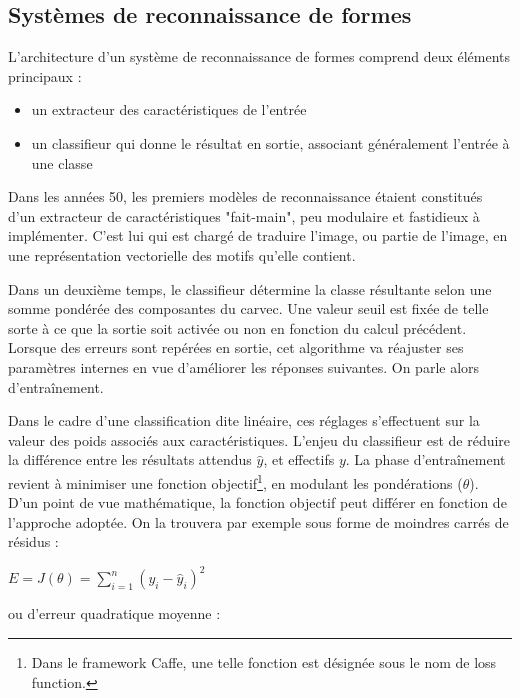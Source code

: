 \documentclass[12pt]{report}
\begin{document}
\subsection{Systèmes de reconnaissance de formes}

L'architecture d'un système de reconnaissance de formes comprend deux éléments principaux :

\begin{itemize}
  \item un extracteur des caractéristiques de l'entrée
  \item un classifieur qui donne le résultat en sortie, associant généralement l'entrée à une classe
\end{itemize}



Dans les années 50, les premiers modèles de reconnaissance étaient constitués d'un extracteur de caractéristiques "fait-main", peu modulaire et fastidieux à implémenter\cite{Bib_LeCun}.
C'est lui qui est chargé de traduire l'image, ou partie de l'image, en une représentation vectorielle des motifs qu'elle contient.
\par
Dans un deuxième temps, le classifieur détermine la classe résultante selon une somme pondérée des composantes du \gls{carvec}.
Une valeur seuil est fixée de telle sorte à ce que la sortie soit activée ou non en fonction du calcul précédent.
Lorsque des erreurs sont repérées en sortie, cet algorithme va réajuster ses paramètres internes en vue d'améliorer les réponses suivantes. On parle alors d'entraînement.
\par
Dans le cadre d'une classification dite linéaire, ces réglages s'effectuent sur la valeur des poids associés aux caractéristiques.
L'enjeu du classifieur est de réduire la différence entre les résultats attendus $\hat{y}$, et effectifs $y$.
La phase d'entraînement revient à minimiser une fonction objectif\footnote{Dans le framework Caffe, une telle fonction est désignée sous le nom de loss function.}, en modulant les pondérations ($\theta$).
D'un point de vue mathématique, la fonction objectif peut différer en fonction de l'approche adoptée. On la trouvera par exemple sous forme de moindres carrés de résidus\cite{Bib_WikiLS} :

\begin{center} $ E = J({\theta}) =  \sum\limits_{i=1}^{n} (y_{i} - \hat{y}_{i} )^2 $ \end{center}

ou d'erreur quadratique moyenne\cite{Bib_WikiMSE} :
\end{document}
